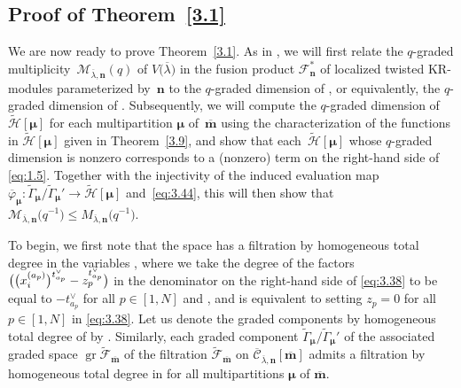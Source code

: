 \documentclass[pdftex]{sigma}
\numberwithin{equation}{section}
\DeclareMathOperator{\gr}{gr}
\begin{document}
\subsection[Proof of Theorem 3.1]{Proof of Theorem~\ref{3.1}}\label{Section 3.6}

We are now ready to prove Theorem~\ref{3.1}. As in \cite{AK07,AKS06}, we will first relate the $q$-graded multiplicity~$\mathcal{M}_{\overline{\lambda},\mathbf{n}}(q)$ of $V\bigl(\overline{\lambda}\bigr)$ in the fusion product $\mathcal{F}_{\mathbf{n}}^*$ of localized twisted KR-modules parameterized by~$\mathbf{n}$ to the $q$-graded dimension of , or equivalently, the $q$-graded dimension of \smash{$\gr\tilde{\mathcal{F}}_{\overline{ \mathbf{m}}}$}. Subsequently, we will compute the $q$-graded dimension of $\tilde{\mathcal{H}}[\bm{\mu}]$ for each multipartition $\bm{\mu}$ of~$\overline{\mathbf{m}}$ using the characterization of the functions in $\tilde{\mathcal{H}}[\bm{\mu}]$ given in Theorem~\ref{3.9}, and show that each~$\tilde{\mathcal{H}}[\bm{\mu}]$ whose $q$-graded dimension is nonzero corresponds to a (nonzero) term on the right-hand side of \eqref{eq:1.5}. Together with the injectivity of the induced evaluation map $\overline{\varphi}_{\bm{\mu}}\colon\tilde{ \Gamma}_{\bm{\mu}}/\tilde{\Gamma}_{\bm{\mu}}'\to\tilde{ \mathcal{H}}[\bm{\mu}]$ and~\eqref{eq:3.44}, this will then show that $\mathcal{M}_{\overline{\lambda},\mathbf{n}}\bigl(q^{-1}\bigr)\leq M_{\overline{\lambda},\mathbf{n}}\bigl(q^{-1}\bigr)$.

To begin, we first note that the space  has a filtration by homogeneous total degree in the variables , where we take the degree of the factors $\bigl(\smash{\bigl(x_i^{(a_p)}\bigr)^{t_{a_p}^{ \vee}}}\allowbreak-\smash{z_p^{t_{a_p}^{\vee}}}\bigr)$ in the denominator on the right-hand side of \eqref{eq:3.38} to be equal to $-t_{a_p}^{\vee}$ for all $p\in[1,N]$ and , and is equivalent to setting $z_p=0$ for all $p\in[1,N]$ in \eqref{eq:3.38}. Let us denote the graded components by homogeneous total degree of  by . Similarly, each graded component $\tilde{\Gamma}_{\bm{\mu}}/ \tilde{\Gamma}_{\bm{\mu}}'$ of the associated graded space $\gr\tilde{\mathcal{F}}_{\overline{\mathbf{m}}}$ of the filtration $\tilde{\mathcal{F}}_{\overline{\mathbf{m}}}$ on $\overline{\mathcal{C}}_{\overline{\lambda},\mathbf{n}}[\overline{\mathbf{m}}]$ admits a filtration by homogeneous total degree in  for all multipartitions $\bm{\mu}$ of $\overline{\mathbf{m}}$.
\end{document}
